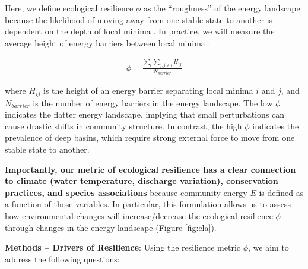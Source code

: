 \documentclass[12pt, class=article, crop=false]{standalone}
\begin{document}
Here, we define ecological resilience $\phi$ as the ``roughness'' of the energy landscape because the likelihood of moving away from one stable state to another is dependent on the depth of local minima \citep{suzuki_energy_2021}.
In practice, we will measure the average height of energy barriers between local minima \citep{suzuki_energy_2021}:

\begin{align}\label{eq:phi}
\phi = \frac{\sum_i \sum_{j, j \ne i} H_{ij}}{N_{barrier}}
\end{align}\label{eq:phi}

where $H_{ij}$ is the height of an energy barrier separating local minima $i$ and $j$, and $N_{barrier}$ is the number of energy barriers in the energy landscape.
The low $\phi$ indicates the flatter energy landscape, implying that small perturbations can cause drastic shifts in community structure.
In contrast, the high $\phi$ indicates the prevalence of deep basins, which require strong external force to move from one stable state to another.

\textbf{Importantly, our metric of ecological resilience has a clear connection to climate (water temperature, discharge variation), conservation practices, and species associations} because community energy $E$ is defined as a function of those variables.
In particular, this formulation allows us to assess how environmental changes will increase/decrease the ecological resilience $\phi$ through changes in the energy landscape (Figure \ref{fig:ela}). 

\textbf{Methods -- Drivers of Resilience}: Using the resilience metric $\phi$, we aim to address the following questions:
\end{document}
